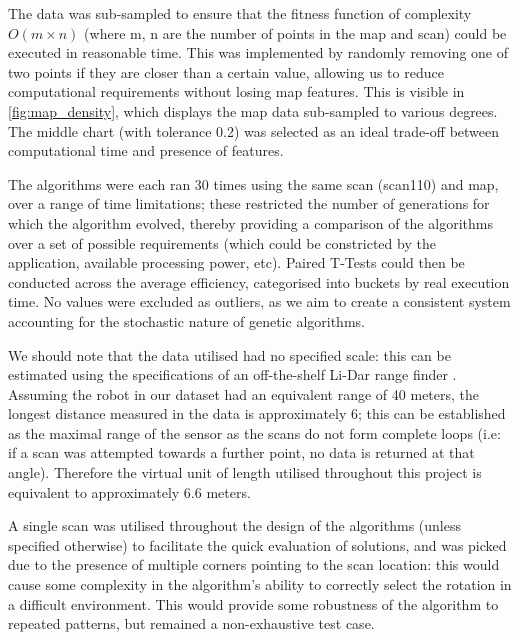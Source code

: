 \documentclass[authoryearcitations]{UoYCSproject}
\begin{document}
The data was sub-sampled to ensure that the fitness function of complexity $O(m\times n)$ (where m, n are the number of points in the map and scan) could be executed in reasonable time. This was implemented by randomly removing one of two points if they are closer than a certain value, allowing us to reduce computational requirements without losing map features. This is visible in \autoref{fig:map_density}, which displays the map data sub-sampled to various degrees. The middle chart (with tolerance 0.2) was selected as an ideal trade-off between computational time and presence of features. \newline

The algorithms were each ran 30 times using the same scan (scan110) and map, over a range of time limitations; these restricted the number of generations for which the algorithm evolved, thereby providing a comparison of the algorithms over a set of possible requirements (which could be constricted by the application, available processing power, etc). Paired T-Tests could then be conducted across the average efficiency, categorised into buckets by real execution time. No values were excluded as outliers, as we aim to create a consistent system accounting for the stochastic nature of genetic algorithms. \newline

We should note that the data utilised had no specified scale: this can be estimated using the specifications of an off-the-shelf Li-Dar range finder \cite{noauthor_undated-bu}. Assuming the robot in our dataset had an equivalent range of 40 meters, the longest distance measured in the data is approximately 6; this can be established as the maximal range of the sensor as the scans do not form complete loops (i.e: if a scan was attempted towards a further point, no data is returned at that angle). Therefore the virtual unit of length utilised throughout this project is equivalent to approximately 6.6 meters. \newline

A single scan was utilised throughout the design of the algorithms (unless specified otherwise) to facilitate the quick evaluation of solutions, and was picked due to the presence of multiple corners pointing to the scan location: this would cause some complexity in the algorithm's ability to correctly select the rotation in a difficult environment. This would provide some robustness of the algorithm to repeated patterns, but remained a non-exhaustive test case. \newline
\end{document}
